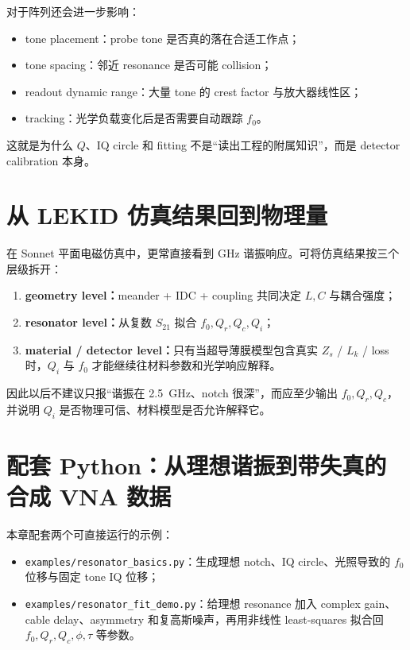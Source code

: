 \documentclass[11pt,a4paper,openany]{ctexrep}
\begin{document}
对于阵列还会进一步影响：
\begin{itemize}
  \item tone placement：probe tone 是否真的落在合适工作点；
  \item tone spacing：邻近 resonance 是否可能 collision；
  \item readout dynamic range：大量 tone 的 crest factor 与放大器线性区；
  \item tracking：光学负载变化后是否需要自动跟踪 $f_0$。
\end{itemize}

这就是为什么 $Q$、IQ circle 和 fitting 不是“读出工程的附属知识”，而是 detector calibration 本身。

\section{从 LEKID 仿真结果回到物理量}

\begin{projectbox}
在 Sonnet 平面电磁仿真中，更常直接看到 GHz 谐振响应。可将仿真结果按三个层级拆开：
\begin{enumerate}
  \item \textbf{geometry level：}meander + IDC + coupling 共同决定 $L,C$ 与耦合强度；
  \item \textbf{resonator level：}从复数 $S_{21}$ 拟合 $f_0,Q_r,Q_c,Q_i$；
  \item \textbf{material / detector level：}只有当超导薄膜模型包含真实 $Z_s$ / $L_k$ / loss 时，$Q_i$ 与 $f_0$ 才能继续往材料参数和光学响应解释。
\end{enumerate}
因此以后不建议只报“谐振在 \SI{2.5}{GHz}、notch 很深”，而应至少输出 $f_0,Q_r,Q_c$，并说明 $Q_i$ 是否物理可信、材料模型是否允许解释它。
\end{projectbox}

\section{配套 Python：从理想谐振到带失真的合成 VNA 数据}

本章配套两个可直接运行的示例：
\begin{itemize}
  \item \texttt{examples/resonator\_basics.py}：生成理想 notch、IQ circle、光照导致的 $f_0$ 位移与固定 tone IQ 位移；
  \item \texttt{examples/resonator\_fit\_demo.py}：给理想 resonance 加入 complex gain、cable delay、asymmetry 和复高斯噪声，再用非线性 least-squares 拟合回 $f_0,Q_r,Q_c,\phi,\tau$ 等参数。
\end{itemize}
\end{document}

